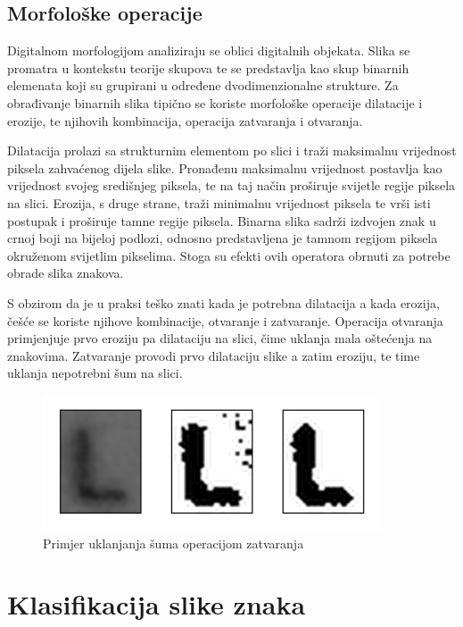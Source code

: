 \documentclass[lmodern, utf8, diplomski, numeric]{fer}
\begin{document}
\subsection{Morfološke operacije}

Digitalnom morfologijom analiziraju se oblici digitalnih objekata. Slika se promatra u kontekstu teorije skupova te se predstavlja kao skup binarnih elemenata koji su grupirani u određene dvodimenzionalne strukture. Za obrađivanje binarnih slika tipično se koriste morfološke operacije dilatacije i erozije, te njihovih kombinacija, operacija zatvaranja i otvaranja. 

Dilatacija prolazi sa strukturnim elementom po slici i traži maksimalnu vrijednost piksela zahvaćenog dijela slike. Pronađenu maksimalnu vrijednost postavlja kao vrijednost svojeg središnjeg piksela, te na taj način proširuje svijetle regije piksela na slici. Erozija, s druge strane, traži minimalnu vrijednost piksela te vrši isti postupak i proširuje tamne regije piksela. Binarna slika sadrži izdvojen znak u crnoj boji na bijeloj podlozi, odnosno predstavljena je tamnom regijom piksela okruženom svijetlim pikselima. Stoga su efekti ovih operatora obrnuti za potrebe obrade slika znakova.  

S obzirom da je u praksi teško znati kada je potrebna dilatacija a kada erozija, češće se koriste njihove kombinacije, otvaranje i zatvaranje.
Operacija otvaranja primjenjuje prvo eroziju pa dilataciju na slici, čime uklanja mala oštećenja na znakovima. Zatvaranje provodi prvo dilataciju slike a zatim eroziju, te time uklanja nepotrebni šum na slici. 

\begin{figure}[ht!]
\centering
\includegraphics[width=10cm]{slike/closing_example.png}
\caption{Primjer uklanjanja šuma operacijom zatvaranja}
\end{figure}


\section{Klasifikacija slike znaka}
\end{document}
